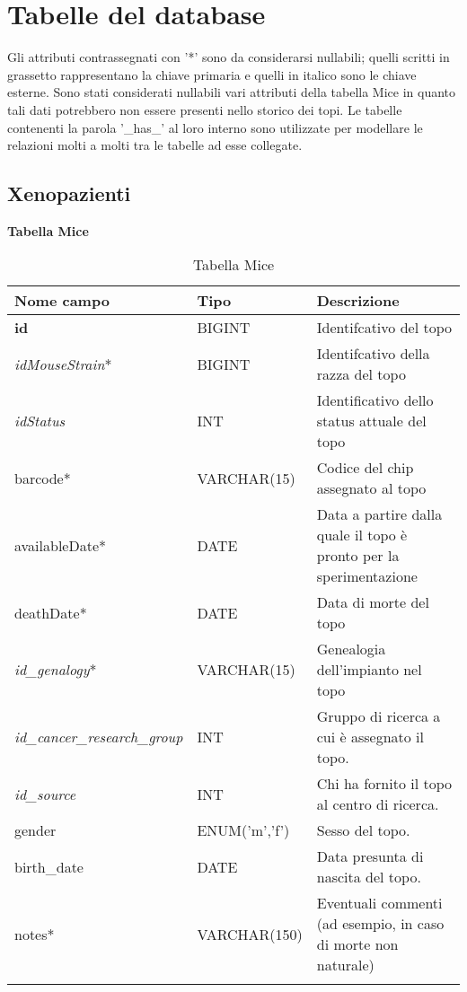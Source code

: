 \chapter{Tabelle del database}\label{chap:xenotable}

Gli attributi contrassegnati con '*' sono da considerarsi nullabili; quelli scritti in grassetto rappresentano la chiave primaria e quelli in italico sono le chiave esterne. Sono stati considerati nullabili vari attributi della tabella Mice in quanto tali dati potrebbero non essere presenti nello storico dei topi. Le tabelle contenenti la parola '\_has\_' al loro interno sono utilizzate per modellare le relazioni molti a molti tra le tabelle ad esse collegate. 

\section{Xenopazienti}

\textbf{Tabella Mice}

\begin{longtable}{|l|l|p{4.4cm}|}
\hline
\textbf{Nome campo} &	\textbf{Tipo} &	\textbf{Descrizione}\\ \hline
\textbf{id} &	BIGINT &	Identifcativo del topo\\ \hline
\textit{idMouseStrain}* &	BIGINT &	Identifcativo della razza del topo\\ \hline
\textit{idStatus} &	INT &	Identificativo dello status attuale del topo\\ \hline
barcode* &	VARCHAR(15) &	Codice del chip assegnato al topo\\ \hline
availableDate* &	DATE &	Data a partire dalla quale il topo \`e pronto per la sperimentazione\\ \hline
deathDate* &	DATE &	Data di morte del topo\\ \hline
\textit{id\_genalogy}* &	VARCHAR(15) &	Genealogia dell'impianto nel topo\\ \hline
\textit{id\_cancer\_research\_group} &	INT &	Gruppo di ricerca a cui \`e assegnato il topo.\\ \hline
\textit{id\_source}&	INT &	Chi ha fornito il topo al centro di ricerca.\\ \hline
gender &	ENUM('m','f') &	Sesso del topo.\\ \hline
birth\_date &	DATE &	Data presunta di nascita del topo.\\ \hline
notes* &	VARCHAR(150) &	Eventuali commenti (ad esempio, in caso di morte non naturale)\\ \hline
\caption{Tabella Mice}
\end{longtable}

